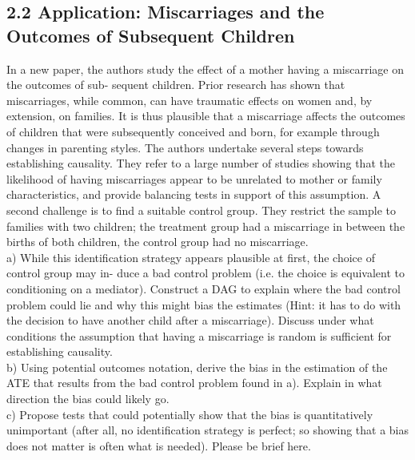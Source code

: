 \documentclass[a4paper,12pt,oneside,English]{article}
\begin{document}
\subsection{2.2 
Application: Miscarriages and the Outcomes of Subsequent Children}
In a new paper, the authors study the effect of a mother having a miscarriage on the outcomes of sub- sequent children. Prior research has shown that miscarriages, while common, can have traumatic effects on women and, by extension, on families. It is thus plausible that a miscarriage affects the outcomes of children that were subsequently conceived and born, for example through changes in parenting styles.
The authors undertake several steps towards establishing causality. They refer to a large number of studies showing that the likelihood of having miscarriages appear to be unrelated to mother or family characteristics, and provide balancing tests in support of this assumption. A second challenge is to find a suitable control group. They restrict the sample to families with two children; the treatment group had a miscarriage in between the births of both children, the control group had no miscarriage.\\

a) While this identification strategy appears plausible at first, the choice of control group may in- duce a bad control problem (i.e. the choice is equivalent to conditioning on a mediator). Construct a DAG to explain where the bad control problem could lie and why this might bias the estimates (Hint: it has to do with the decision to have another child after a miscarriage). Discuss under what conditions the assumption that having a miscarriage is random is sufficient for establishing causality.\\
b) Using potential outcomes notation, derive the bias in the estimation of the ATE that results from the bad control problem found in a). Explain in what direction the bias could likely go.\\
c) Propose tests that could potentially show that the bias is quantitatively unimportant (after all, no identification strategy is perfect; so showing that a bias does not matter is often what is needed). Please be brief here.\\
\end{document}

